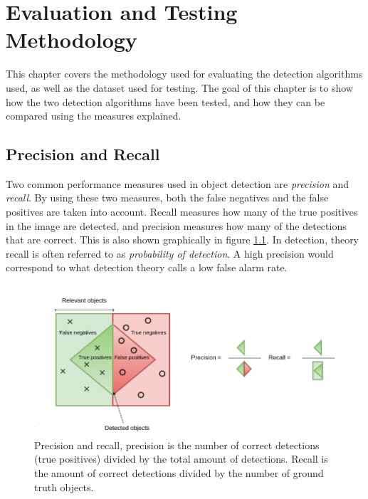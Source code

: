 
\chapter{Evaluation and Testing Methodology}
\label{sec:eval}
This chapter covers the methodology used for evaluating the detection algorithms used, as well as the dataset used for testing. The goal of this chapter is to show how the two detection algorithms have been tested, and how they can be compared using the measures explained.

\section{Precision and Recall}
\label{sec:prec_rec}

Two common performance measures used in object detection are \textit{precision} and \textit{recall}. By using these two measures, both the false negatives and the false positives are taken into account. Recall measures how many of the true positives in the image are detected, and precision measures how many of the detections that are correct. This is also shown graphically in figure \ref{fig:prec_recall}. In detection, theory recall is often referred to as \textit{probability of detection}. A high precision would correspond to what detection theory calls a low false alarm rate.

\begin{figure}[h!]
    \centering
    \includegraphics[scale=0.33]{fig/recall_precision.png}
    \caption{Precision and recall, precision is the number of correct detections (true positives) divided by the total amount of detections. Recall is the amount of correct detections divided by the number of ground truth objects.}
    \label{fig:prec_recall}
\end{figure}


